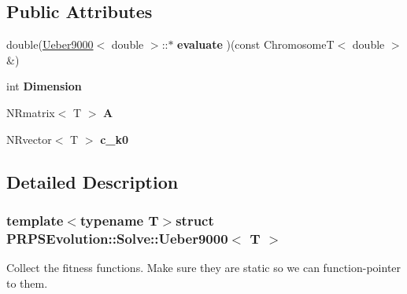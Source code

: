 \subsection*{Public Attributes}
\begin{DoxyCompactItemize}
\item 
\hypertarget{struct_p_r_p_s_evolution_1_1_solve_1_1_ueber9000_acc89aa4176099e0fe3633f396426d06b}{double(\hyperlink{struct_p_r_p_s_evolution_1_1_solve_1_1_ueber9000}{Ueber9000}$<$ double $>$\-::$\ast$ {\bfseries evaluate} )(const Chromosome\-T$<$ double $>$ \&)}\label{struct_p_r_p_s_evolution_1_1_solve_1_1_ueber9000_acc89aa4176099e0fe3633f396426d06b}

\item 
\hypertarget{struct_p_r_p_s_evolution_1_1_solve_1_1_ueber9000_a9cf3886c2996dcd383d8f6c59384d885}{int {\bfseries Dimension}}\label{struct_p_r_p_s_evolution_1_1_solve_1_1_ueber9000_a9cf3886c2996dcd383d8f6c59384d885}

\item 
\hypertarget{struct_p_r_p_s_evolution_1_1_solve_1_1_ueber9000_a6a085ca9a0f953103ace589c43759d6f}{N\-Rmatrix$<$ T $>$ {\bfseries A}}\label{struct_p_r_p_s_evolution_1_1_solve_1_1_ueber9000_a6a085ca9a0f953103ace589c43759d6f}

\item 
\hypertarget{struct_p_r_p_s_evolution_1_1_solve_1_1_ueber9000_a396cc51877f198aaf43dfef5d89506b3}{N\-Rvector$<$ T $>$ {\bfseries c\-\_\-k0}}\label{struct_p_r_p_s_evolution_1_1_solve_1_1_ueber9000_a396cc51877f198aaf43dfef5d89506b3}

\end{DoxyCompactItemize}


\subsection{Detailed Description}
\subsubsection*{template$<$typename T$>$struct P\-R\-P\-S\-Evolution\-::\-Solve\-::\-Ueber9000$<$ T $>$}

Collect the fitness functions. Make sure they are static so we can function-\/pointer to them. 

